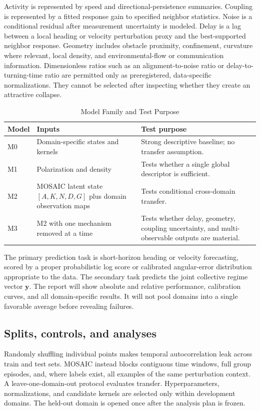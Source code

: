 \documentclass[conference]{../../../../Conference-LaTeX-template_10-17-19/IEEEtran}
\begin{document}
Activity is represented by speed and directional-persistence summaries. Coupling is represented by a fitted response gain to specified neighbor statistics. Noise is a conditional residual after measurement uncertainty is modeled. Delay is a lag between a local heading or velocity perturbation proxy and the best-supported neighbor response. Geometry includes obstacle proximity, confinement, curvature where relevant, local density, and environmental-flow or communication information. Dimensionless ratios such as an alignment-to-noise ratio or delay-to-turning-time ratio are permitted only as preregistered, data-specific normalizations. They cannot be selected after inspecting whether they create an attractive collapse.

\begin{table}[t]
\caption{Model Family and Test Purpose}
\centering\small
\begin{tabular}{p{}p{}p{}}
\toprule
Model & Inputs & Test purpose\\
\midrule
M0 & Domain-specific states and kernels & Strong descriptive baseline; no transfer assumption.\\
M1 & Polarization and density & Tests whether a single global descriptor is sufficient.\\
M2 & MOSAIC latent state $[A,K,N,D,G]$ plus domain observation maps & Tests conditional cross-domain transfer.\\
M3 & M2 with one mechanism removed at a time & Tests whether delay, geometry, coupling uncertainty, and multi-observable outputs are material.\\
\bottomrule
\end{tabular}
\end{table}

The primary prediction task is short-horizon heading or velocity forecasting, scored by a proper probabilistic log score or calibrated angular-error distribution appropriate to the data. The secondary task predicts the joint collective regime vector $\mathbf{y}$. The report will show absolute and relative performance, calibration curves, and all domain-specific results. It will not pool domains into a single favorable average before revealing failures.

\subsection{Splits, controls, and analyses}
Randomly shuffling individual points makes temporal autocorrelation leak across train and test sets. MOSAIC instead blocks contiguous time windows, full group episodes, and, where labels exist, all examples of the same perturbation context. A leave-one-domain-out protocol evaluates transfer. Hyperparameters, normalizations, and candidate kernels are selected only within development domains. The held-out domain is opened once after the analysis plan is frozen.
\end{document}
